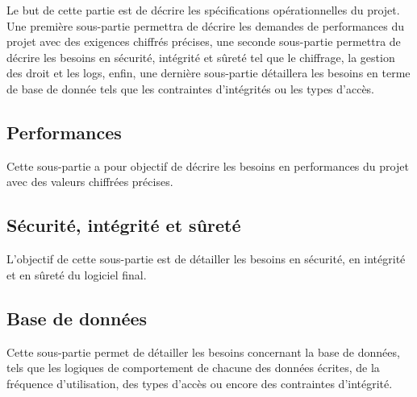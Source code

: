 Le but de cette partie est de décrire les spécifications opérationnelles du projet. Une première sous-partie permettra de décrire les demandes de performances du projet avec des exigences chiffrés précises, une seconde sous-partie permettra de décrire les besoins en sécurité, intégrité et sûreté tel que le chiffrage, la gestion des droit et les logs, enfin, une dernière sous-partie détaillera les besoins en terme de base de donnée tels que les contraintes d'intégrités ou les types d'accès.

\subsection{Performances}

Cette sous-partie a pour objectif de décrire les besoins en performances du projet avec des valeurs chiffrées précises.




\subsection{Sécurité, intégrité et sûreté}

L'objectif de cette sous-partie est de détailler les besoins en sécurité, en intégrité et en sûreté du logiciel final.





\subsection{Base de données}

Cette sous-partie permet de détailler les besoins concernant la base de données, tels que les logiques de comportement de chacune des données écrites, de la fréquence d'utilisation, des types d'accès ou encore des contraintes d'intégrité.
